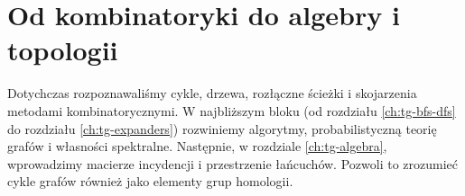 \section*{Od kombinatoryki do algebry i topologii}

Dotychczas rozpoznawaliśmy cykle, drzewa, rozłączne ścieżki
i skojarzenia metodami kombinatorycznymi. W najbliższym bloku
(od rozdziału \ref{ch:tg-bfs-dfs} do rozdziału \ref{ch:tg-expanders})
rozwiniemy algorytmy, probabilistyczną teorię grafów i własności
spektralne. Następnie, w rozdziale \ref{ch:tg-algebra},
wprowadzimy macierze incydencji i przestrzenie łańcuchów.
Pozwoli to zrozumieć cykle grafów również jako elementy grup homologii.



